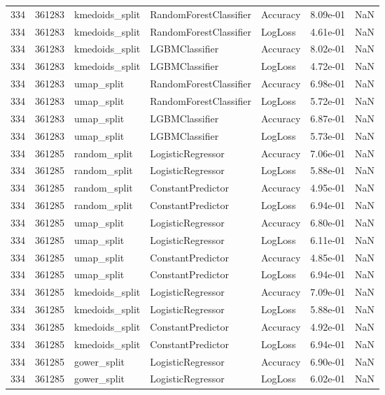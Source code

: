 \begin{tabular}{rrlllrr}
334 & 361283 & kmedoids\_split & RandomForestClassifier & Accuracy & 8.09e-01 & NaN \\
334 & 361283 & kmedoids\_split & RandomForestClassifier & LogLoss & 4.61e-01 & NaN \\
334 & 361283 & kmedoids\_split & LGBMClassifier & Accuracy & 8.02e-01 & NaN \\
334 & 361283 & kmedoids\_split & LGBMClassifier & LogLoss & 4.72e-01 & NaN \\
334 & 361283 & umap\_split & RandomForestClassifier & Accuracy & 6.98e-01 & NaN \\
334 & 361283 & umap\_split & RandomForestClassifier & LogLoss & 5.72e-01 & NaN \\
334 & 361283 & umap\_split & LGBMClassifier & Accuracy & 6.87e-01 & NaN \\
334 & 361283 & umap\_split & LGBMClassifier & LogLoss & 5.73e-01 & NaN \\
334 & 361285 & random\_split & LogisticRegressor & Accuracy & 7.06e-01 & NaN \\
334 & 361285 & random\_split & LogisticRegressor & LogLoss & 5.88e-01 & NaN \\
334 & 361285 & random\_split & ConstantPredictor & Accuracy & 4.95e-01 & NaN \\
334 & 361285 & random\_split & ConstantPredictor & LogLoss & 6.94e-01 & NaN \\
334 & 361285 & umap\_split & LogisticRegressor & Accuracy & 6.80e-01 & NaN \\
334 & 361285 & umap\_split & LogisticRegressor & LogLoss & 6.11e-01 & NaN \\
334 & 361285 & umap\_split & ConstantPredictor & Accuracy & 4.85e-01 & NaN \\
334 & 361285 & umap\_split & ConstantPredictor & LogLoss & 6.94e-01 & NaN \\
334 & 361285 & kmedoids\_split & LogisticRegressor & Accuracy & 7.09e-01 & NaN \\
334 & 361285 & kmedoids\_split & LogisticRegressor & LogLoss & 5.88e-01 & NaN \\
334 & 361285 & kmedoids\_split & ConstantPredictor & Accuracy & 4.92e-01 & NaN \\
334 & 361285 & kmedoids\_split & ConstantPredictor & LogLoss & 6.94e-01 & NaN \\
334 & 361285 & gower\_split & LogisticRegressor & Accuracy & 6.90e-01 & NaN \\
334 & 361285 & gower\_split & LogisticRegressor & LogLoss & 6.02e-01 & NaN \\

\end{tabular}
